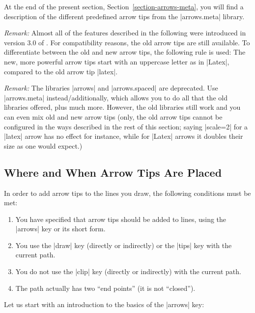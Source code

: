 At the end of the present section, Section~\ref{section-arrows-meta},
you will find a description of the different predefined arrow tips
from the |arrows.meta| library.

\emph{Remark:} Almost all of the features described in the following
were introduced in version 3.0 of \tikzname. For compatibility
reasons, the old arrow tips are still available. To differentiate
between the old and new arrow tips, the following rule is used: The
new, more powerful arrow tips start with an uppercase letter as in
|Latex|, compared to the old arrow tip |latex|.

\emph{Remark:} The libraries |arrows| and |arrows.spaced| are
deprecated. Use |arrows.meta| instead/additionally, which allows you
to do all that the old libraries offered, plus much more. However, the
old libraries still work and you can even mix old and new arrow tips
(only, the old arrow tips cannot be configured in the ways described
in the rest of this section; saying |scale=2| for a |latex| arrow has
no effect for instance, while for |Latex| arrows it doubles their size
as one would expect.)


\subsection{Where and When Arrow Tips Are Placed}
\label{section-arrow-tips-where}

In order to add arrow tips to the lines you draw, the following
conditions must be met:

\begin{enumerate}
\item You have specified that arrow tips should be added to 
  lines, using the |arrows| key or its short form.
\item You use the |draw| key (directly or indirectly) or the |tips|
  key with the current path. 
\item You do not use the |clip| key (directly or indirectly) with the current
  path. 
\item The path actually has two ``end points'' (it is not
  ``closed'').
\end{enumerate}

Let us start with an introduction to the basics of the |arrows| key: 

